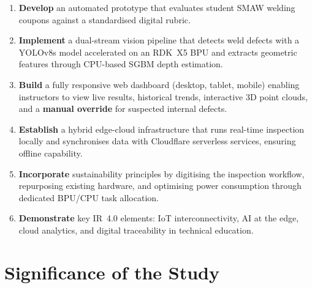 \documentclass[12pt,a4paper]{article}
\begin{document}
\begin{enumerate}[leftmargin=*, label=\arabic*.]
  \item \textbf{Develop} an automated prototype that evaluates student SMAW welding coupons against a
        standardised digital rubric.
  \item \textbf{Implement} a dual-stream vision pipeline that detects weld defects with a YOLOv8s model
        accelerated on an RDK~X5 BPU and extracts geometric features through CPU-based SGBM depth estimation.
  \item \textbf{Build} a fully responsive web dashboard (desktop, tablet, mobile) enabling instructors to
        view live results, historical trends, interactive 3D point clouds, and a \textbf{manual override} for
        suspected internal defects.
  \item \textbf{Establish} a hybrid edge-cloud infrastructure that runs real-time inspection locally and
        synchronises data with Cloudflare serverless services, ensuring offline capability.
  \item \textbf{Incorporate} sustainability principles by digitising the inspection workflow, repurposing
        existing hardware, and optimising power consumption through dedicated BPU/CPU task allocation.
  \item \textbf{Demonstrate} key IR~4.0 elements: IoT interconnectivity, AI at the edge, cloud analytics,
        and digital traceability in technical education.
\end{enumerate}

\section{Significance of the Study}
\end{document}
